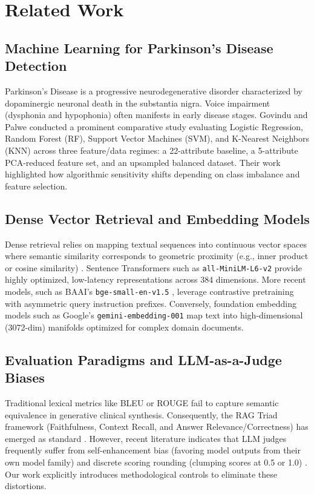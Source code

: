 \documentclass[conference]{IEEEtran}
\begin{document}
\section{Related Work}

\subsection{Machine Learning for Parkinson's Disease Detection}
Parkinson's Disease is a progressive neurodegenerative disorder characterized by dopaminergic neuronal death in the substantia nigra. Voice impairment (dysphonia and hypophonia) often manifests in early disease stages. Govindu and Palwe \cite{govindu2023early} conducted a prominent comparative study evaluating Logistic Regression, Random Forest (RF), Support Vector Machines (SVM), and K-Nearest Neighbors (KNN) across three feature/data regimes: a 22-attribute baseline, a 5-attribute PCA-reduced feature set, and an upsampled balanced dataset. Their work highlighted how algorithmic sensitivity shifts depending on class imbalance and feature selection.

\subsection{Dense Vector Retrieval and Embedding Models}
Dense retrieval relies on mapping textual sequences into continuous vector spaces where semantic similarity corresponds to geometric proximity (e.g., inner product or cosine similarity) \cite{reimers2019sentence}. Sentence Transformers such as \texttt{all-MiniLM-L6-v2} provide highly optimized, low-latency representations across 384 dimensions. More recent models, such as BAAI's \texttt{bge-small-en-v1.5} \cite{xiao2023bge}, leverage contrastive pretraining with asymmetric query instruction prefixes. Conversely, foundation embedding models such as Google's \texttt{gemini-embedding-001} map text into high-dimensional (3072-dim) manifolds optimized for complex domain documents.

\subsection{Evaluation Paradigms and LLM-as-a-Judge Biases}
Traditional lexical metrics like BLEU or ROUGE fail to capture semantic equivalence in generative clinical synthesis. Consequently, the RAG Triad framework (Faithfulness, Context Recall, and Answer Relevance/Correctness) has emerged as standard \cite{es2023ragas}. However, recent literature indicates that LLM judges frequently suffer from self-enhancement bias (favoring model outputs from their own model family) and discrete scoring rounding (clumping scores at 0.5 or 1.0) \cite{zheng2024judging}. Our work explicitly introduces methodological controls to eliminate these distortions.
\end{document}
